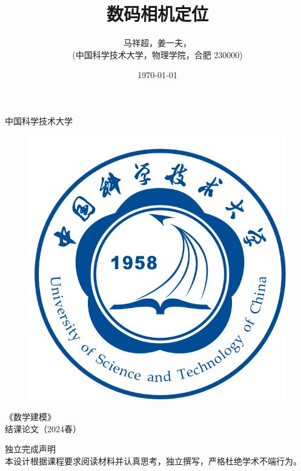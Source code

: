 \documentclass{article}
\title{{\heiti\huge{数码相机定位}}}
\author{\large{马祥超，姜一夫，}\\(中国科学技术大学，物理学院，合肥 230000)}
\date{\today}
\numberwithin{equation}{section}						%
\numberwithin{figure}{section}							%
\begin{document}
\begin{sloppypar}
	\thispagestyle{empty}
	\begin{center}
		\parbox[t][3cm][c]{\textwidth}{
		\begin{center}
				{\kaishu\Huge 中国科学技术大学}
		\end{center}}
		\parbox[t][8cm][c]{\textwidth}{\huge
		\begin{center} 
				\begin{figure}[H]
					\centering
					\includegraphics[width=0.4\linewidth]{ustcblue}
				\end{figure}
		\end{center} }
		\parbox[t][2cm][t]{\textwidth}{
		\begin{center}  
				{\kaishu\huge 《数学建模》\\结课论文（2024春）}
		\end{center} }
		
		\parbox[t][5cm][b]{0.7\textwidth}{
			{\Large{} }  }
		
		\parbox[t][5cm][c]{\textwidth}{ {\large
		\begin{center}
					{\Large\heiti 独立完成声明}
					\\
					本设计根据课程要求阅读材料并认真思考，独立撰写，严格杜绝学术不端行为。
		\end{center} } }
	\end{center}
	\clearpage
	\maketitle
	

\end{sloppypar}
\end{document}
